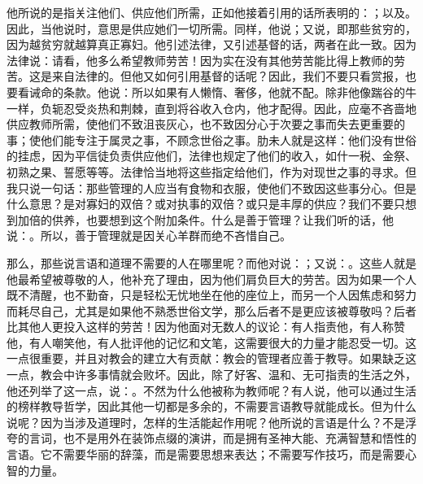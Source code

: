 他所说的是指关注他们、供应他们所需，正如他接着引用的话所表明的：；以及。因此，当他说时，意思是供应她们一切所需。同样，他说；又说，即那些贫穷的，因为越贫穷就越算真正寡妇。他引述法律，又引述基督的话，两者在此一致。因为法律说：请看，他多么希望教师劳苦！因为实在没有其他劳苦能比得上教师的劳苦。这是来自法律的。但他又如何引用基督的话呢？因此，我们不要只看赏报，也要看诫命的条款。他说：所以如果有人懒惰、奢侈，他就不配。除非他像踹谷的牛一样，负轭忍受炎热和荆棘，直到将谷收入仓内，他才配得。因此，应毫不吝啬地供应教师所需，使他们不致沮丧灰心，也不致因分心于次要之事而失去更重要的事；使他们能专注于属灵之事，不顾念世俗之事。肋未人就是这样：他们没有世俗的挂虑，因为平信徒负责供应他们，法律也规定了他们的收入，如什一税、金祭、初熟之果、誓愿等等。法律恰当地将这些指定给他们，作为对现世之事的寻求。但我只说一句话：那些管理的人应当有食物和衣服，使他们不致因这些事分心。但是什么意思？是对寡妇的双倍？或对执事的双倍？或只是丰厚的供应？我们不要只想到加倍的供养，也要想到这个附加条件。什么是善于管理？让我们听的话，他说：。所以，善于管理就是因关心羊群而绝不吝惜自己。\par

那么，那些说言语和道理不需要的人在哪里呢？而他对说：；又说：。这些人就是他最希望被尊敬的人，他补充了理由，因为他们肩负巨大的劳苦。因为如果一个人既不清醒，也不勤奋，只是轻松无忧地坐在他的座位上，而另一个人因焦虑和努力而耗尽自己，尤其是如果他不熟悉世俗文学，那么后者不是更应该被尊敬吗？后者比其他人更投入这样的劳苦！因为他面对无数人的议论：有人指责他，有人称赞他，有人嘲笑他，有人批评他的记忆和文笔，这需要很大的力量才能忍受一切。这一点很重要，并且对教会的建立大有贡献：教会的管理者应善于教导。如果缺乏这一点，教会中许多事情就会败坏。因此，除了好客、温和、无可指责的生活之外，他还列举了这一点，说：。不然为什么他被称为教师呢？有人说，他可以通过生活的榜样教导哲学，因此其他一切都是多余的，不需要言语教导就能成长。但为什么说呢？因为当涉及道理时，怎样的生活能起作用呢？他所说的言语是什么？不是浮夸的言词，也不是用外在装饰点缀的演讲，而是拥有圣神大能、充满智慧和悟性的言语。它不需要华丽的辞藻，而是需要思想来表达；不需要写作技巧，而是需要心智的力量。\par

